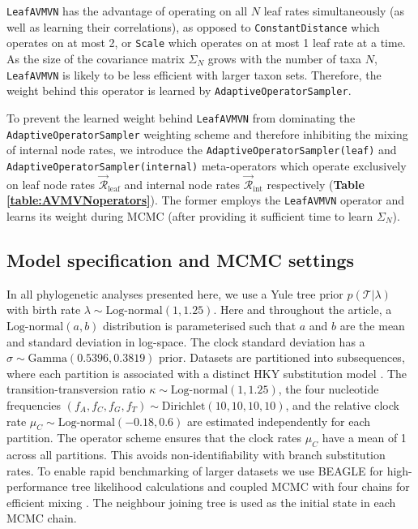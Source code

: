 \documentclass[10pt,letterpaper]{article}
\begin{document}
\texttt{LeafAVMVN} has the advantage of operating on all $N$ leaf rates simultaneously (as well as learning their correlations), as opposed to \texttt{ConstantDistance} which operates on at most 2, or \texttt{Scale} which operates on at most 1 leaf rate at a time. 
As the size of the covariance matrix $\Sigma_N$ grows with the number of taxa $N$, \texttt{LeafAVMVN} is likely to be less efficient with larger taxon sets.
Therefore, the weight behind this operator is learned by \texttt{AdaptiveOperatorSampler}.



To prevent the learned weight behind \texttt{LeafAVMVN} from dominating the \texttt{AdaptiveOperatorSampler} weighting scheme and therefore inhibiting the mixing of internal node rates, we 
introduce the \texttt{AdaptiveOperatorSampler(leaf)} and \texttt{AdaptiveOperatorSampler(internal)} meta-operators which operate exclusively on leaf node rates $\vec{\mathcal{R}}^{\,}_\text{leaf}$ and internal node rates $\vec{\mathcal{R}}^{\,}_\text{int}$ respectively  (\textbf{Table \ref{table:AVMVNoperators}}). 
The former employs the \texttt{LeafAVMVN} operator and learns its weight during MCMC (after providing it sufficient time to learn $\Sigma_N$).









\clearpage
\subsection*{Model specification and MCMC settings} \label{sect:methods}

In all phylogenetic analyses presented here, we use a Yule \cite{yule1925ii} tree prior $p(\mathcal{T}|\lambda)$ with birth rate $\lambda \sim \text{Log-normal}(1,1.25)$.
Here and throughout the article, a $\text{Log-normal}(a,b)$ distribution is parameterised such that $a$ and $b$ are the mean and standard deviation in log-space.
The clock standard deviation has a $\sigma \sim \text{Gamma}(0.5396,0.3819)$ prior.
Datasets are partitioned into subsequences, where each partition is associated with a distinct HKY substitution model \cite{hasegawa1985dating}.
The transition-transversion ratio $\kappa \sim \text{Log-normal}(1, 1.25)$, the four nucleotide frequencies $(f_A, f_C, f_G, f_T) \sim \text{Dirichlet}(10,10,10,10)$, and the relative clock rate $\mu_C \sim \text{Log-normal}(-0.18, 0.6)$ are estimated independently for each partition.
The operator scheme ensures that the clock rates $\mu_C$ have a mean of 1 across all partitions. 
This avoids non-identifiability with branch substitution rates.
To enable rapid benchmarking of larger datasets we use BEAGLE for high-performance tree likelihood calculations \cite{ayres2012beagle} and coupled MCMC with four chains for efficient mixing \cite{muller2019coupled}.
The neighbour joining tree \cite{saitou1987neighbor} is used as the initial state in each MCMC chain.
\end{document}

